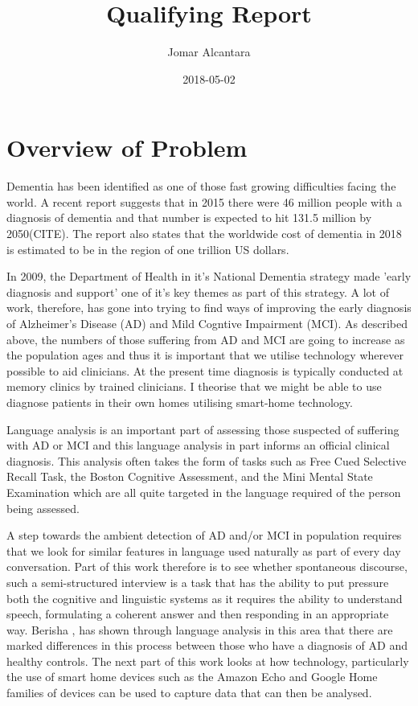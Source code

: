 \documentclass{article}
\title{Qualifying Report}
\date{2018-05-02}
\author{Jomar Alcantara}
\begin{document}
	\maketitle
	\newpage
	\section{Overview of Problem}
	Dementia has been identified as one of those fast growing difficulties facing the world. A recent report suggests that in 2015 there were 46 million people with a diagnosis of dementia and that number is expected to hit 131.5 million by 2050(CITE). The report also states that the worldwide cost of dementia in 2018 is estimated to be in the region of one trillion US dollars.
	\newline
	\par
	In 2009, the Department of Health in it's National Dementia strategy made 'early diagnosis and support' one of it's key themes as part of this strategy. A lot of work, therefore, has gone into trying to find ways of improving the early diagnosis of Alzheimer's Disease (AD) and Mild Cogntive Impairment (MCI). As described above, the numbers of those suffering from AD and MCI are going to increase as the population ages and thus it is important that we utilise technology wherever possible to aid clinicians. At the present time diagnosis is typically conducted at memory clinics by trained clinicians. I theorise that we might be able to use diagnose patients in their own homes utilising smart-home technology. 
	\newline
	\par
	Language analysis is an important part of assessing those suspected of suffering with AD or MCI and this language analysis in part informs an official clinical diagnosis. This analysis often takes the form of tasks such as Free Cued Selective Recall Task, the Boston Cognitive Assessment, and the Mini Mental State Examination which are all quite targeted in the language required of the person being assessed. 
	\newline
	\par
	A step towards the ambient detection of AD and/or MCI in population requires that we look for similar features in language used naturally as part of every day conversation. Part of this work therefore is to see whether spontaneous discourse, such a semi-structured interview is a task that has the ability to put pressure both the cognitive and linguistic systems as it requires the ability to understand speech, formulating a coherent answer and then responding in an appropriate way. Berisha \cite{Berisha2015}, has shown through language analysis in this area that there are marked differences in this process between those who have a diagnosis of AD and healthy controls. The next part of this work looks at how technology, particularly the use of smart home devices such as the Amazon Echo and Google Home families of devices can be used to capture data that can then be analysed.
\end{document}
